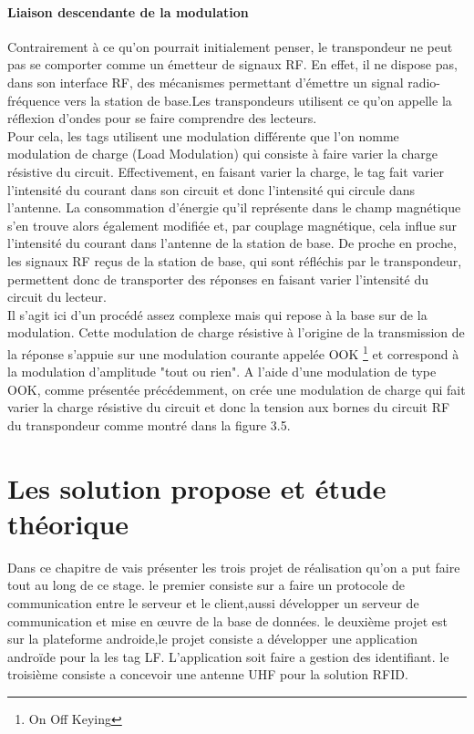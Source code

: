 \documentclass[11pt, a4paper, twoside]{book}
\begin{document}
\subsubsection{Liaison descendante de la modulation}
Contrairement à ce qu'on pourrait initialement penser, le transpondeur ne peut pas se comporter comme un émetteur de signaux RF. En effet, il ne dispose pas, dans son interface RF, des mécanismes permettant d'émettre un signal radio-fréquence vers la station de base.Les transpondeurs utilisent ce qu'on appelle la réflexion d'ondes pour se faire comprendre des lecteurs. \\

Pour cela, les tags utilisent une modulation différente que l'on nomme modulation de charge (Load Modulation) qui consiste à faire varier la charge résistive du circuit. Effectivement, en faisant varier la charge, le tag fait varier l'intensité du courant dans son circuit et donc l'intensité qui circule dans l'antenne. La consommation d'énergie qu'il représente dans le champ magnétique s'en trouve alors également modifiée et, par couplage magnétique, cela influe sur l'intensité du courant dans l'antenne de la station de base. De proche en proche, les signaux RF reçus de la station de base, qui sont réfléchis par le transpondeur, permettent donc de transporter des réponses en faisant varier l'intensité du circuit du lecteur.\\

Il s'agit ici d'un procédé assez complexe mais qui repose à la base sur de la modulation. Cette modulation de charge résistive à l'origine de la transmission de la réponse s'appuie sur une modulation courante appelée OOK \footnote{On Off Keying} et correspond à la modulation d'amplitude "tout ou rien". A l'aide d'une modulation de type OOK, comme présentée précédemment, on crée une modulation de charge qui fait varier la charge résistive du circuit et donc la tension aux bornes du circuit RF du transpondeur comme montré dans la figure 3.5.\\
\chapter{Les solution propose et étude théorique }
Dans ce chapitre de vais présenter les trois projet de réalisation qu'on a put faire tout au long de ce stage. le premier consiste sur a faire un protocole de communication entre le serveur et le client,aussi développer un serveur de communication et mise en œuvre de la base de données. le deuxième projet est sur la plateforme androide,le projet consiste a développer une application androïde pour la les tag LF. L'application soit faire a gestion des identifiant. le troisième consiste a concevoir une antenne UHF pour la solution RFID. 
\end{document}
